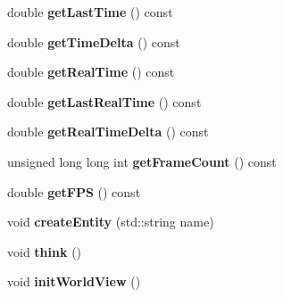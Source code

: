 \begin{DoxyCompactItemize}
\item 
\hypertarget{class_c_base_engine_a7a128539bc09b8dbc219fec3b5d09f04}{
double {\bfseries getLastTime} () const }
\label{class_c_base_engine_a7a128539bc09b8dbc219fec3b5d09f04}

\item 
\hypertarget{class_c_base_engine_a639af0fb7070b46c3caf532572ebd3bf}{
double {\bfseries getTimeDelta} () const }
\label{class_c_base_engine_a639af0fb7070b46c3caf532572ebd3bf}

\item 
\hypertarget{class_c_base_engine_aec8538dfc4c28b195c4cefbceff373ff}{
double {\bfseries getRealTime} () const }
\label{class_c_base_engine_aec8538dfc4c28b195c4cefbceff373ff}

\item 
\hypertarget{class_c_base_engine_aee4bfbcd8f699c89a0f1ce96abd8e822}{
double {\bfseries getLastRealTime} () const }
\label{class_c_base_engine_aee4bfbcd8f699c89a0f1ce96abd8e822}

\item 
\hypertarget{class_c_base_engine_ac1a7b9f07d661fe7ef6bbdc98e553525}{
double {\bfseries getRealTimeDelta} () const }
\label{class_c_base_engine_ac1a7b9f07d661fe7ef6bbdc98e553525}

\item 
\hypertarget{class_c_base_engine_abd49d564d1aecd528039897b21eef66a}{
unsigned long long int {\bfseries getFrameCount} () const }
\label{class_c_base_engine_abd49d564d1aecd528039897b21eef66a}

\item 
\hypertarget{class_c_base_engine_adce5f957133b5e2b7ccca631355800ad}{
double {\bfseries getFPS} () const }
\label{class_c_base_engine_adce5f957133b5e2b7ccca631355800ad}

\item 
\hypertarget{class_c_base_engine_a70f80b67ea65db4fb56b1a86acdacdfc}{
void {\bfseries createEntity} (std::string name)}
\label{class_c_base_engine_a70f80b67ea65db4fb56b1a86acdacdfc}

\item 
\hypertarget{class_c_base_engine_a044ac7781508da2aa24bf74cd2b36d7f}{
void {\bfseries think} ()}
\label{class_c_base_engine_a044ac7781508da2aa24bf74cd2b36d7f}

\item 
\hypertarget{class_c_base_engine_af56586ffe12fc017e75b9104bde5398d}{
void {\bfseries initWorldView} ()}
\label{class_c_base_engine_af56586ffe12fc017e75b9104bde5398d}


\end{DoxyCompactItemize}
